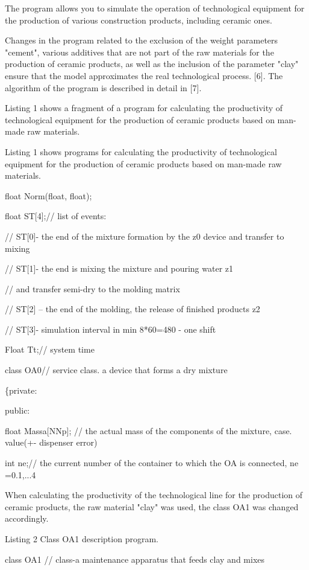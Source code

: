 The program allows you to simulate the operation of technological
equipment for the production of various construction products, including
ceramic ones.

Changes in the program related to the exclusion of the weight parameters
"cement", various additives that are not part of the raw materials for
the production of ceramic products, as well as the inclusion of the
parameter "clay" ensure that the model approximates the real
technological process. {[}6{]}. The algorithm of the program is
described in detail in {[}7{]}.

Listing 1 shows a fragment of a program for calculating the productivity
of technological equipment for the production of ceramic products based
on man-made raw materials.

Listing 1 shows programs for calculating the productivity of
technological equipment for the production of ceramic products based on
man-made raw materials.

float Norm(float, float);

float ST{[}4{]};// list of events:

// ST{[}0{]}- the end of the mixture formation by the z0 device and
transfer to mixing

// ST{[}1{]}- the end is mixing the mixture and pouring water z1

// and transfer semi-dry to the molding matrix

// ST{[}2{]} -- the end of the molding, the release of finished products
z2

// ST{[}3{]}- simulation interval in min 8*60=480 - one shift

Float Tt;// system time

class OA0// service class. a device that forms a dry mixture

\{private:

public:

float Massa{[}NNp{]}; // the actual mass of the components of the
mixture, case. value(+- dispenser error)

int ne;// the current number of the container to which the OA is
connected, ne =0.1,...4

When calculating the productivity of the technological line for the
production of ceramic products, the raw material "clay" was used, the
class OA1 was changed accordingly.

Listing 2 Class OA1 description program.

class OA1 // class-a maintenance apparatus that feeds clay and mixes

